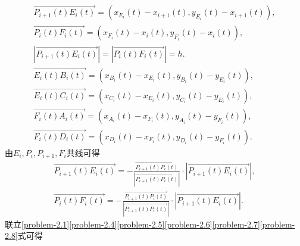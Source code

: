 \documentclass[lang=cn,newtx,10pt,scheme=chinese]{../Template/elegantbook}
\begin{document}
\begin{gather}
\overrightarrow{P_{i+1}\left( t \right) E_i\left( t \right) }=\left( x_{E_i}\left( t \right) -x_{i+1}\left( t \right) ,y_{E_i}\left( t \right) -x_{i+1}\left( t \right) \right) ,\label{problem-2.4}
\\
\overrightarrow{P_i\left( t \right) F_i\left( t \right) }=\left( x_{F_i}\left( t \right) -x_i\left( t \right) ,y_{F_i}\left( t \right) -x_i\left( t \right) \right) ,\label{problem-2.5}
\\
\left| \overrightarrow{P_{i+1}\left( t \right) E_i\left( t \right) } \right|=\left| \overrightarrow{P_i\left( t \right) F_i\left( t \right) } \right|=h.\label{problem-2.6}
\\
\overrightarrow{E_i\left( t \right) B_i\left( t \right) }=\left( x_{B_i}\left( t \right) -x_{E_i}\left( t \right) ,y_{B_i}\left( t \right) -y_{E_i}\left( t \right) \right) ,\label{problem-2..1}
\\
\overrightarrow{E_i\left( t \right) C_i\left( t \right) }=\left( x_{C_i}\left( t \right) -x_{E_i}\left( t \right) ,y_{C_i}\left( t \right) -y_{E_i}\left( t \right) \right) ,\label{problem-2..2}
\\
\overrightarrow{F_i\left( t \right) A_i\left( t \right) }=\left( x_{A_i}\left( t \right) -x_{F_i}\left( t \right) ,y_{A_i}\left( t \right) -y_{F_i}\left( t \right) \right) ,\label{problem-2..3}
\\
\overrightarrow{F_i\left( t \right) D_i\left( t \right) }=\left( x_{D_i}\left( t \right) -x_{F_i}\left( t \right) ,y_{D_i}\left( t \right) -y_{F_i}\left( t \right) \right) .\label{problem-2..4}
\end{gather}
由$E_i,P_i,P_{i+1},F_i$共线可得
\begin{gather}
\overrightarrow{P_{i+1}\left( t \right) E_i\left( t \right) }=-\frac{\overrightarrow{P_{i+1}\left( t \right) P_i\left( t \right) }}{\left| \overrightarrow{P_{i+1}\left( t \right) P_i\left( t \right) } \right|}\cdot \left| \overrightarrow{P_{i+1}\left( t \right) E_i\left( t \right) } \right|,\label{problem-2.7}
\\
\overrightarrow{P_i\left( t \right) F_i\left( t \right) }=-\frac{\overrightarrow{P_{i+1}\left( t \right) P_i\left( t \right) }}{\left| \overrightarrow{P_{i+1}\left( t \right) P_i\left( t \right) } \right|}\cdot \left| \overrightarrow{P_{i+1}\left( t \right) E_i\left( t \right) } \right|.\label{problem-2.8}
\end{gather}
联立\eqref{problem-2.1}\eqref{problem-2.4}\eqref{problem-2.5}\eqref{problem-2.6}\eqref{problem-2.7}\eqref{problem-2.8}式可得
\end{document}
